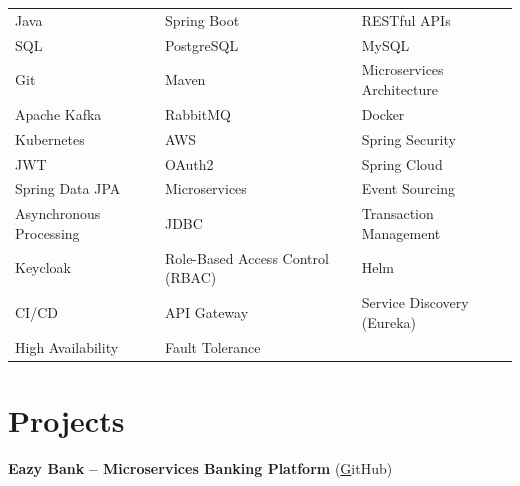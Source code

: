 \documentclass[11pt]{article}
\begin{document}
\begin{tabular}{p{} p{} p{}}


Java & Spring Boot & RESTful APIs  \\


SQL & PostgreSQL & MySQL  \\


Git & Maven & Microservices Architecture  \\


Apache Kafka & RabbitMQ & Docker  \\


Kubernetes & AWS & Spring Security  \\


JWT & OAuth2 & Spring Cloud  \\


Spring Data JPA & Microservices & Event Sourcing  \\


Asynchronous Processing & JDBC & Transaction Management  \\


Keycloak & Role-Based Access Control (RBAC) & Helm  \\


CI/CD & API Gateway & Service Discovery (Eureka)  \\


High Availability & Fault Tolerance &   \\



\end{tabular}









\section*{Projects}



\textbf{ Eazy Bank – Microservices Banking Platform }
 (\href{https://GitHub}GitHub) 
\end{document}
